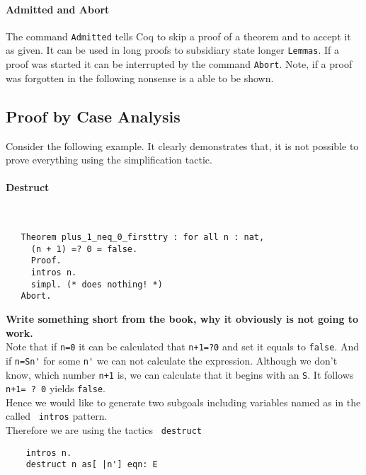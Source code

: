 	\paragraph{Admitted and Abort}
	
	The command \lstinline!Admitted! tells Coq to skip a proof of a theorem and to accept it as given.
	It can be used in long proofs to subsidiary state longer \lstinline!Lemmas!.
	If a proof was started it can be interrupted by the command \lstinline!Abort!.
	Note, if a proof was forgotten in the following nonsense is a able to be shown. \\
	
	
 \subsection{Proof by Case Analysis}
   Consider the following example. It clearly demonstrates that, it is not possible to prove everything using the simplification tactic.   
   
   
   \paragraph{Destruct}	~\vspace{-5mm}
   \begin{lstlisting}
   Theorem plus_1_neq_0_firsttry : for all n : nat,
     (n + 1) =? 0 = false.
     Proof.
     intros n.
     simpl. (* does nothing! *)
   Abort.
   \end{lstlisting}
   
   \textbf{ Write something short from the book, why it obviously is not going to work.}\\		
	Note that if \lstinline!n=0! it can be calculated that \lstinline!n+1=?0! and set it equals to  \lstinline!false!. 
	And if \lstinline!n=Sn'! for some \lstinline!n'! we can not calculate the expression.
	Although we don't know, which number \lstinline!n+1! is, we can calculate that it begins with an \lstinline!S!.
	It follows \lstinline!n+1= ? 0! yields \lstinline!false!.\\	
    Hence we would like to generate two subgoals including variables named as in the called \lstinline! intros! pattern.	 \\        
    Therefore we are using the tactics \lstinline! destruct!	
	\begin{lstlisting}
	intros n.
	destruct n as[ |n'] eqn: E
	\end{lstlisting}
	
